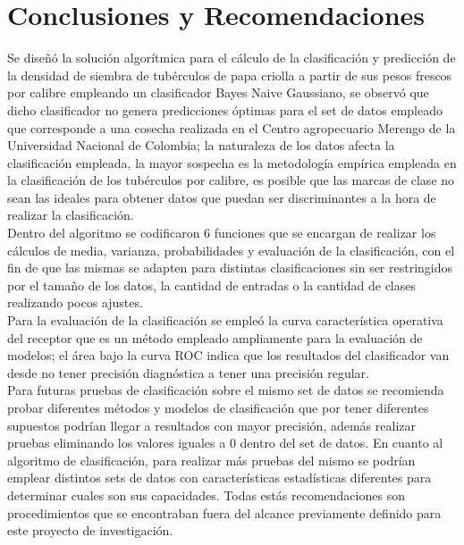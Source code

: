 \chapter{Conclusiones y Recomendaciones}

Se diseñó la solución algorítmica para el cálculo de la clasificación y predicción de la densidad
de siembra de tubérculos de papa criolla a partir de sus pesos frescos por calibre empleando
un clasificador Bayes Naive Gaussiano, se observó que dicho clasificador no genera predicciones
óptimas para el set de datos empleado que corresponde a una cosecha realizada en el Centro
agropecuario Merengo de la Universidad Nacional de Colombia; la naturaleza de los datos afecta
la clasificación empleada, la mayor sospecha es la metodología empírica empleada en la
clasificación de los tubérculos por calibre, es posible que las marcas de clase no sean las
ideales para obtener datos que puedan ser discriminantes a la hora de realizar la clasificación.\\

Dentro del algoritmo se codificaron 6 funciones que se encargan de realizar los cálculos de media,
varianza, probabilidades y evaluación de la clasificación, con el fin de que las mismas se adapten
para distintas clasificaciones sin ser restringidos por el tamaño de los datos, la cantidad de
entradas o la cantidad de clases realizando pocos ajustes.\\

Para la evaluación de la clasificación se empleó la curva característica operativa del receptor
que es un método empleado ampliamente para la evaluación de modelos; el área bajo la curva ROC
indica que los resultados del clasificador van desde no tener precisión diagnóstica a tener una
precisión regular.\\

Para futuras pruebas de clasificación sobre el mismo set de datos se recomienda probar diferentes
métodos y modelos de clasificación que por tener diferentes supuestos podrían llegar a resultados
con mayor precisión, además realizar pruebas eliminando los valores iguales a 0 dentro del set de datos. En cuanto al algoritmo de clasificación, para realizar más pruebas del mismo se podrían emplear
distintos sets de datos con características estadísticas diferentes para determinar cuales son
sus capacidades. Todas estás recomendaciones son procedimientos que se encontraban fuera del alcance
previamente definido para este proyecto de investigación.\\


